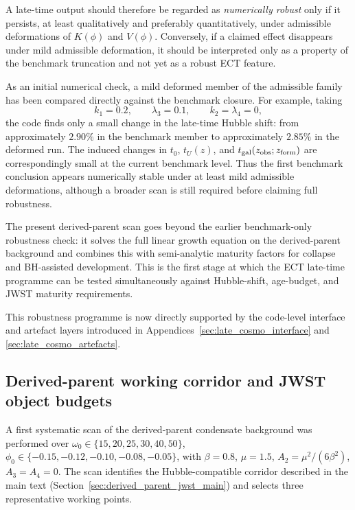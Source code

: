 \documentclass[11pt,a4paper]{article}
\numberwithin{equation}{section}
\begin{document}
A late-time output should therefore be regarded as
\emph{numerically robust} only if it persists, at least qualitatively
and preferably quantitatively, under admissible deformations of
$K(\phi)$ and $V(\phi)$.
Conversely, if a claimed effect disappears under mild admissible
deformation, it should be interpreted only as a property of the
benchmark truncation and not yet as a robust ECT feature.

As an initial numerical check, a mild deformed member of the admissible
family has been compared directly against the benchmark closure.
For example, taking
\[
k_1=0.2,\qquad \lambda_3=0.1,
\qquad k_2=\lambda_4=0,
\]
the code finds only a small change in the late-time Hubble shift:
from approximately $2.90\%$ in the benchmark member to approximately
$2.85\%$ in the deformed run.
The induced changes in $t_0$, $t_U(z)$, and
$t_{\rm gal}(z_{\rm obs};z_{\rm form})$ are correspondingly small at the
current benchmark level.
Thus the first benchmark conclusion appears numerically stable under at
least mild admissible deformations, although a broader scan is still
required before claiming full robustness.

The present derived-parent scan goes beyond the earlier benchmark-only
robustness check: it solves the full linear growth equation on the
derived-parent background and combines this with semi-analytic maturity
factors for collapse and BH-assisted development.
This is the first stage at which the ECT late-time programme can be
tested simultaneously against Hubble-shift, age-budget, and JWST
maturity requirements.

This robustness programme is now directly supported by the code-level
interface and artefact layers introduced in
Appendices~\ref{sec:late_cosmo_interface} and
\ref{sec:late_cosmo_artefacts}.

\subsection{Derived-parent working corridor and JWST object budgets}
\label{sec:late_jwst_object_budgets}

A first systematic scan of the derived-parent condensate background was
performed over
$\omega_0\in\{15,20,25,30,40,50\}$,
$\phi_0\in\{-0.15,-0.12,-0.10,-0.08,-0.05\}$,
with $\beta=0.8$, $\mu=1.5$, $A_2=\mu^2/(6\beta^2)$, $A_3=A_4=0$.
The scan identifies the Hubble-compatible corridor described in the
main text (Section~\ref{sec:derived_parent_jwst_main}) and selects
three representative working points.
\end{document}
